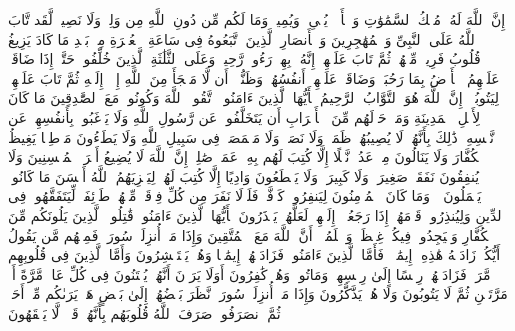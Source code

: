 \startbuffer[\q:9:116]
إِنَّ ٱللَّهَ لَهُۥ مُلۡكُ ٱلسَّمَٰوَٰتِ وَٱلۡأَرۡضِۖ یُحۡیِۦ وَیُمِیتُۚ وَمَا لَكُم مِّن دُونِ ٱللَّهِ مِن وَلِیࣲّ وَلَا نَصِیرࣲ%
\stopbuffer%
\startbuffer[\q:9:117]
لَّقَد تَّابَ ٱللَّهُ عَلَى ٱلنَّبِیِّ وَٱلۡمُهَٰجِرِینَ وَٱلۡأَنصَارِ ٱلَّذِینَ ٱتَّبَعُوهُ فِی سَاعَةِ ٱلۡعُسۡرَةِ مِنۢ بَعۡدِ مَا كَادَ یَزِیغُ قُلُوبُ فَرِیقࣲ مِّنۡهُمۡ ثُمَّ تَابَ عَلَیۡهِمۡۚ إِنَّهُۥ بِهِمۡ رَءُوفࣱ رَّحِیمࣱ%
\stopbuffer%
\startbuffer[\q:9:118]
وَعَلَى ٱلثَّلَٰثَةِ ٱلَّذِینَ خُلِّفُوا۟ حَتَّىٰۤ إِذَا ضَاقَتۡ عَلَیۡهِمُ ٱلۡأَرۡضُ بِمَا رَحُبَتۡ وَضَاقَتۡ عَلَیۡهِمۡ أَنفُسُهُمۡ وَظَنُّوۤا۟ أَن لَّا مَلۡجَأَ مِنَ ٱللَّهِ إِلَّاۤ إِلَیۡهِ ثُمَّ تَابَ عَلَیۡهِمۡ لِیَتُوبُوۤا۟ۚ إِنَّ ٱللَّهَ هُوَ ٱلتَّوَّابُ ٱلرَّحِیمُ%
\stopbuffer%
\startbuffer[\q:9:119]
یَٰۤأَیُّهَا ٱلَّذِینَ ءَامَنُوا۟ ٱتَّقُوا۟ ٱللَّهَ وَكُونُوا۟ مَعَ ٱلصَّٰدِقِینَ%
\stopbuffer%
\startbuffer[\q:9:120]
مَا كَانَ لِأَهۡلِ ٱلۡمَدِینَةِ وَمَنۡ حَوۡلَهُم مِّنَ ٱلۡأَعۡرَابِ أَن یَتَخَلَّفُوا۟ عَن رَّسُولِ ٱللَّهِ وَلَا یَرۡغَبُوا۟ بِأَنفُسِهِمۡ عَن نَّفۡسِهِۦۚ ذَٰلِكَ بِأَنَّهُمۡ لَا یُصِیبُهُمۡ ظَمَأࣱ وَلَا نَصَبࣱ وَلَا مَخۡمَصَةࣱ فِی سَبِیلِ ٱللَّهِ وَلَا یَطَءُونَ مَوۡطِئࣰا یَغِیظُ ٱلۡكُفَّارَ وَلَا یَنَالُونَ مِنۡ عَدُوࣲّ نَّیۡلًا إِلَّا كُتِبَ لَهُم بِهِۦ عَمَلࣱ صَٰلِحٌۚ إِنَّ ٱللَّهَ لَا یُضِیعُ أَجۡرَ ٱلۡمُحۡسِنِینَ%
\stopbuffer%
\startbuffer[\q:9:121]
وَلَا یُنفِقُونَ نَفَقَةࣰ صَغِیرَةࣰ وَلَا كَبِیرَةࣰ وَلَا یَقۡطَعُونَ وَادِیًا إِلَّا كُتِبَ لَهُمۡ لِیَجۡزِیَهُمُ ٱللَّهُ أَحۡسَنَ مَا كَانُوا۟ یَعۡمَلُونَ%
\stopbuffer%
\startbuffer[\q:9:122]
۞ وَمَا كَانَ ٱلۡمُؤۡمِنُونَ لِیَنفِرُوا۟ كَاۤفَّةࣰۚ فَلَوۡلَا نَفَرَ مِن كُلِّ فِرۡقَةࣲ مِّنۡهُمۡ طَاۤئِفَةࣱ لِّیَتَفَقَّهُوا۟ فِی ٱلدِّینِ وَلِیُنذِرُوا۟ قَوۡمَهُمۡ إِذَا رَجَعُوۤا۟ إِلَیۡهِمۡ لَعَلَّهُمۡ یَحۡذَرُونَ%
\stopbuffer%
\startbuffer[\q:9:123]
یَٰۤأَیُّهَا ٱلَّذِینَ ءَامَنُوا۟ قَٰتِلُوا۟ ٱلَّذِینَ یَلُونَكُم مِّنَ ٱلۡكُفَّارِ وَلۡیَجِدُوا۟ فِیكُمۡ غِلۡظَةࣰۚ وَٱعۡلَمُوۤا۟ أَنَّ ٱللَّهَ مَعَ ٱلۡمُتَّقِینَ%
\stopbuffer%
\startbuffer[\q:9:124]
وَإِذَا مَاۤ أُنزِلَتۡ سُورَةࣱ فَمِنۡهُم مَّن یَقُولُ أَیُّكُمۡ زَادَتۡهُ هَٰذِهِۦۤ إِیمَٰنࣰاۚ فَأَمَّا ٱلَّذِینَ ءَامَنُوا۟ فَزَادَتۡهُمۡ إِیمَٰنࣰا وَهُمۡ یَسۡتَبۡشِرُونَ%
\stopbuffer%
\startbuffer[\q:9:125]
وَأَمَّا ٱلَّذِینَ فِی قُلُوبِهِم مَّرَضࣱ فَزَادَتۡهُمۡ رِجۡسًا إِلَىٰ رِجۡسِهِمۡ وَمَاتُوا۟ وَهُمۡ كَٰفِرُونَ%
\stopbuffer%
\startbuffer[\q:9:126]
أَوَلَا یَرَوۡنَ أَنَّهُمۡ یُفۡتَنُونَ فِی كُلِّ عَامࣲ مَّرَّةً أَوۡ مَرَّتَیۡنِ ثُمَّ لَا یَتُوبُونَ وَلَا هُمۡ یَذَّكَّرُونَ%
\stopbuffer%
\startbuffer[\q:9:127]
وَإِذَا مَاۤ أُنزِلَتۡ سُورَةࣱ نَّظَرَ بَعۡضُهُمۡ إِلَىٰ بَعۡضٍ هَلۡ یَرَىٰكُم مِّنۡ أَحَدࣲ ثُمَّ ٱنصَرَفُوا۟ۚ صَرَفَ ٱللَّهُ قُلُوبَهُم بِأَنَّهُمۡ قَوۡمࣱ لَّا یَفۡقَهُونَ%
